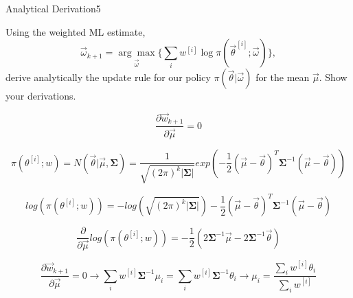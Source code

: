 \begin{questions}


\begin{question}{Analytical Derivation}{5}

Using the weighted ML estimate,
\begin{equation}
    \vec{\omega}_{k+1} = \underset{\vec \omega}{\arg\max} \{ \sum_i w^{[i]} \log \pi(\vec{\theta}^{[i]};\vec{\omega})\},
\end{equation}
derive analytically the update rule for our policy $\pi(\vec{\theta}|\vec{\omega})$ for the mean $\vec{\mu}$. Show your derivations.

\begin{answer}
\begin{equation}
	\frac{\partial \vec{w}_{k+1}}{\partial \vec{\mu}} = 0
\end{equation}

\begin{equation}
 \pi (\theta^{[i]}; w) = N(\vec{\theta}|\vec{\mu},\boldsymbol{\Sigma}) = \frac{1}{\sqrt{(2\pi)^k |\boldsymbol{\Sigma}|}} exp(-\frac{1}{2} (\vec{\mu}-\vec{\theta})^T\boldsymbol{\Sigma}^{-1}(\vec{\mu}-\vec{\theta}))
\end{equation}

\begin{equation}
log(\pi (\theta^{[i]}; w)) = -log(\sqrt{(2\pi)^k|\boldsymbol{\Sigma}| })-\frac{1}{2} (\vec{\mu}-\vec{\theta})^T\boldsymbol{\Sigma}^{-1}(\vec{\mu}-\vec{\theta})
\end{equation}

\begin{equation}
\frac{\partial}{\partial \vec{\mu}}log(\pi (\theta^{[i]}; w)) = -\frac{1}{2}(2 \boldsymbol{\Sigma}^{-1} \vec{\mu} -2\boldsymbol{\Sigma}^{-1} \vec{\theta})
\end{equation}


\begin{equation}
\frac{\partial \vec{w}_{k+1}}{\partial \vec{\mu}} = 0 \rightarrow \sum_i w^{[i]} \boldsymbol{\Sigma}^{-1} {\mu}_i = \sum_i w^{[i]} \boldsymbol{\Sigma}^{-1} \theta_i \rightarrow \mu_i = \frac {\sum_i w^[i] \theta_i}{\sum_i w^{[i]}}
\end{equation}

\end{answer}

\end{question}




\end{questions}
